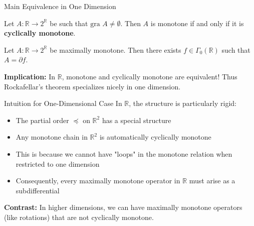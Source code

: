 \documentclass[aspectratio=169,10pt]{beamer}
\begin{document}
\begin{frame}{Main Equivalence in One Dimension}
    \begin{theorem}[22.22]
        Let $A: \mathbb{R} \to 2^{\mathbb{R}}$ be such that $\text{gra } A \neq \emptyset$.
        Then $A$ is monotone if and only if it is \textbf{cyclically monotone}.
    \end{theorem}

    \begin{corollary}[22.23]
        Let $A: \mathbb{R} \to 2^{\mathbb{R}}$ be maximally monotone. Then there exists
        $f \in \Gamma_0(\mathbb{R})$ such that $A = \partial f$.
    \end{corollary}

    \vspace{0.3cm}
    \textbf{Implication:} In $\mathbb{R}$, monotone and cyclically monotone are equivalent!
    Thus Rockafellar's theorem specializes nicely in one dimension.
\end{frame}

\begin{frame}{Intuition for One-Dimensional Case}
    In $\mathbb{R}$, the structure is particularly rigid:

    \begin{itemize}
        \item The partial order $\preceq$ on $\mathbb{R}^2$ has a special structure
        \item Any monotone chain in $\mathbb{R}^2$ is automatically cyclically monotone
        \item This is because we cannot have "loops" in the monotone relation when restricted to one dimension
        \item Consequently, every maximally monotone operator in $\mathbb{R}$ must arise as a subdifferential
    \end{itemize}

    \vspace{0.5cm}
    \begin{center}
        \textbf{Contrast:} In higher dimensions, we can have maximally monotone operators
        (like rotations) that are not cyclically monotone.
    \end{center}
\end{frame}

\end{document}
